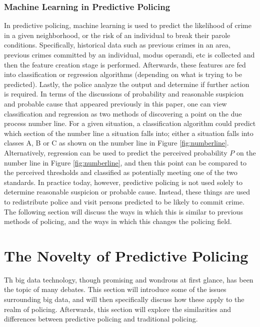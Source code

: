 \documentclass[12pt]{article} %
\begin{document}
\subsubsection{Machine Learning in Predictive Policing}
In predictive policing, machine learning is used to predict the likelihood of crime in a given neighborhood, or the risk of an individual to break their parole conditions. Specifically, historical data such as previous crimes in an area, previous crimes committed by an individual, modus operandi, etc is collected and then the feature creation stage is performed. Afterwards, these features are fed into classification or regression algorithms (depending on what is trying to be predicted). Lastly, the police analyze the output and determine if further action is required. In terms of the discussions of probability and reasonable suspicion and probable cause that appeared previously in this paper, one can view classification and regression as two methods of discovering a point on the due process number line. For a given situation, a classification algorithm could predict which section of the number line a situation falls into; either a situation falls into classes A, B or C as shown on the number line in Figure \ref{fig:numberline}. Alternatively, regression can be used to predict the perceived probability $P$ on the number line in Figure \ref{fig:numberline}, and then this point can be compared to the perceived thresholds and classified as potentially meeting one of the two standards. In practice today, however, predictive policing is not used solely to determine reasonable suspicion or probable cause. Instead, these things are used to redistribute police and visit persons predicted to be likely to commit crime. The following section will discuss the ways in which this is similar to previous methods of policing, and the ways in which this changes the policing field.

\section{The Novelty of Predictive Policing}\label{sec:oldvnew} %
Th big data technology, though promising and wondrous at first glance, has been the topic of many debates. This section will introduce some of the issues surrounding big data, and will then specifically discuss how these apply to the realm of policing. Afterwards, this section will explore the similarities and differences between predictive policing and traditional policing.
\end{document}
